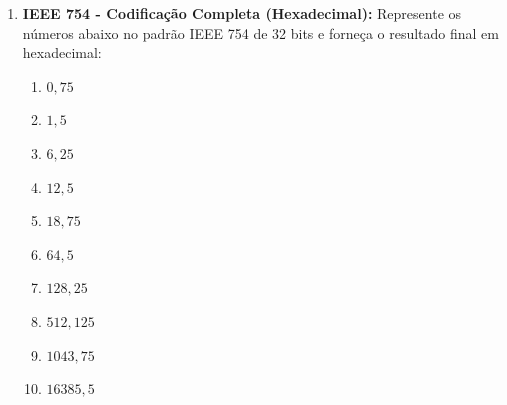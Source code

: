 \begin{enumerate}
    \item \textbf{IEEE 754 - Codificação Completa (Hexadecimal):}
          Represente os números abaixo no padrão IEEE 754 de 32 bits e forneça o resultado final em hexadecimal:
          \begin{enumerate}
              \item $0,75$
              \item $1,5$
              \item $6,25$
              \item $12,5$
              \item $18,75$
              \item $64,5$
              \item $128,25$
              \item $512,125$
              \item $1043,75$
              \item $16385,5$
          \end{enumerate}

\end{enumerate}